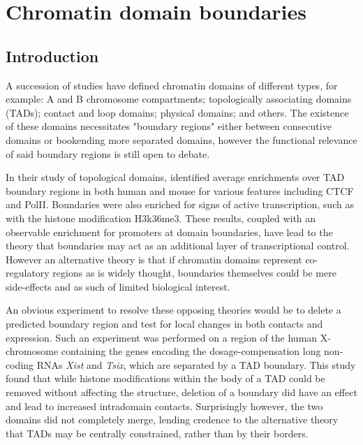 \documentclass[a4paper,11pt,oneside]{book}
\begin{document}

\chapter{Chromatin domain boundaries}\label{chap:boundaries}

\section{Introduction}

A succession of studies have defined chromatin domains of different types, for example: A and B chromosome compartments;\cite{Lieberman2009} topologically associating domains (TADs);\cite{Dixon2012} contact and loop domains;\cite{Rao2014} physical domains;\cite{Sexton2012, Hou2012} and others.\cite{Filippova2014} The existence of these domains necessitates "boundary regions" either between consecutive domains or bookending more separated domains, however the functional relevance of said boundary regions is still open to debate.

In their study of topological domains, \citet{Dixon2012} identified average enrichments over TAD boundary regions in both human and mouse for various features including CTCF and PolII. Boundaries were also enriched for signs of active transcription, such as with the histone modification H3k36me3.\cite{Dixon2012} These results, coupled with an observable enrichment for promoters at domain boundaries, have lead to the theory that boundaries may act as an additional layer of transcriptional control.\cite{Sexton2015} However an alternative theory  is that if chromatin domains represent co-regulatory regions as is widely thought,\cite{LeDily2014, Nora2013, Sexton2015} boundaries themselves could be mere side-effects and as such of limited biological interest.

An obvious experiment to resolve these opposing theories would be to delete a predicted boundary region and test for local changes in both contacts and expression. Such an experiment was performed on a region of the human X-chromosome containing the genes encoding the dosage-compensation long non-coding RNAs \emph{Xist} and \emph{Tsix}, which are separated by a TAD boundary.\cite{Nora2012} This study found that while histone modifications within the body of a TAD could be removed without affecting the structure, deletion of a boundary did have an effect and lead to increased intradomain contacts.\cite{Nora2012} Surprisingly however, the two domains did not completely merge, lending credence to the alternative theory that TADs may be centrally constrained, rather than by their borders.\cite{Nora2012} 
\end{document}
